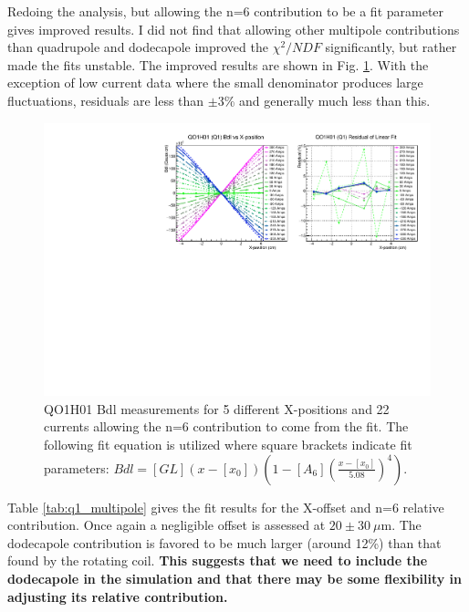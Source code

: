 \documentclass[12pt]{article}
\begin{document}
Redoing the analysis, but allowing the n=6 contribution to be a fit parameter gives improved results. I did not find that allowing other multipole contributions than quadrupole and dodecapole improved the $\chi^2/NDF$ significantly, but rather made the fits unstable. The improved results are shown in Fig. \ref{fig:Q1_BdlvsX}. With the exception of low current data where the small denominator produces large fluctuations, residuals are less than $\pm$3\% and generally much less than this. 
\begin{figure}[!hb]
\centering
\includegraphics[width=1\textwidth]{QO1H01_BdlvsX.pdf}
\caption{\label{fig:Q1_BdlvsX}QO1H01 Bdl measurements for 5 different X-positions and 22 currents allowing the n=6 contribution to come from the fit. The following fit equation is utilized where square brackets indicate fit parameters: $Bdl=[GL](x-[x_0])\left(1-[A_6]\left(\frac{x-[x_0]}{5.08}\right)^4\right)$.}
\end{figure}
Table \ref{tab:q1_multipole} gives the fit results for the X-offset and n=6 relative contribution. Once again a negligible offset is assessed at $20\pm30~\mu$m. The dodecapole contribution is favored to be much larger (around 12\%) than that found by the rotating coil. \textbf{This suggests that we need to include the dodecapole in the simulation and that there may be some flexibility in adjusting its relative contribution.}
\end{document}
